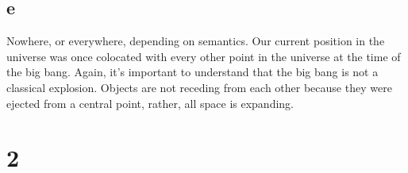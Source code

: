 \documentclass[12pt]{article}
\begin{document}
\subsection*{e}

Nowhere, or everywhere, depending on semantics. Our current position in the universe was once colocated with every other point in the universe at the time of the big bang. Again, it's important to understand that the big bang is not a classical explosion. Objects are not receding from each other because they were ejected from a central point, rather, all space is expanding.


\section{2}
\end{document}
